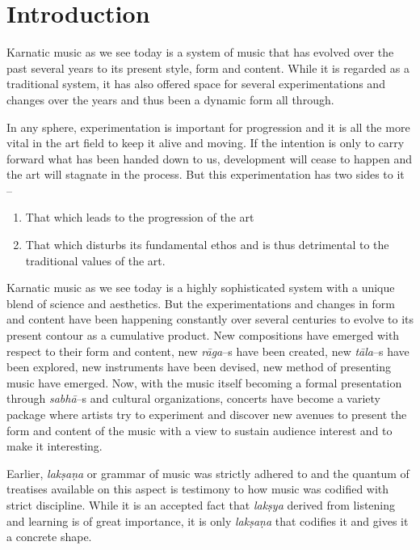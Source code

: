 \section*{Introduction}

Karnatic music as we see today is a system of music that has evolved over the past several years to its present style, form and content. While it is regarded as a traditional system, it has also offered space for several experimentations and changes over the years and thus been a dynamic form all through.

In any sphere, experimentation is important for progression and it is all the more vital in the art field to keep it alive and moving. If the intention is only to carry forward what has been handed down to us, development will cease to happen and the art will stagnate in the process. But this experimentation has two sides to it –

\begin{enumerate}
\item That which leads to the progression of the art

 \item That which disturbs its fundamental ethos and is thus detrimental to the traditional values of the art.

\end{enumerate}

Karnatic music as we see today is a highly sophisticated system with a unique blend of science and aesthetics. But the experimentations and changes in form and content have been happening constantly over several centuries to evolve to its present contour as a cumulative product. New compositions have emerged with respect to their form and content, new \textit{rāga}–s have been created, new \textit{tāla}–s have been explored, new instruments have been devised, new method of presenting music have emerged. Now, with the music itself becoming a formal presentation through \textit{sabhā}–s and cultural organizations, concerts have become a variety package where artists try to experiment and discover new avenues to present the form and content of the music with a view to sustain audience interest and to make it interesting.

Earlier, \textit{lakṣaṇa} or grammar of music was strictly adhered to and the quantum of treatises available on this aspect is testimony to how music was codified with strict discipline. While it is an accepted fact that \textit{lakṣya} derived from listening and learning is of great importance, it is only \textit{lakṣaṇa} that codifies it and gives it a concrete shape.

